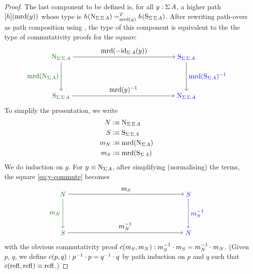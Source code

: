 \documentclass[english,a4paper]{lmcs}
\begin{document}
\begin{proof}
  The last component to be defined is, for all $y : \operatorname{\Sigma} A$,
  a higher path $\mathop{\left[{h}\right]}(\operatorname{\mathrm{mrd}}(y))$ whose type is
  $h(\mathrm{N}_{\operatorname{\Sigma}\operatorname{\Sigma} A}) =^{T}_{\operatorname{\mathrm{mrd}}(y)} h(\mathrm{S}_{\operatorname{\Sigma}\operatorname{\Sigma} A})$.
	After rewriting path-overs as path composition using \cite[Lem~2.11.3]{HoTT},
  the type of this component is equivalent to the the type of commutativity proofs for the square:
	\begin{equation}\label{eq:y-commute}
	\begin{tikzpicture}[x=6.5cm,y=-2cm,baseline=(current bounding box.center)]
	\node[text=darkgreen] (N1) at (0,0) {$\north_{\susp\susp A}$};
	\node[text=darkgreen] (S1) at (0,1) {$\south_{\susp\susp A}$};
	\node[text=darkblue] (S2) at (1,0) {$\south_{\susp\susp A}$};
	\node[text=darkblue] (N2) at (1,1) {$\north_{\susp\susp A}$};
	\draw[->,text=darkgreen] (N1) to node[left] {$\mrd(\north_{\susp A})$} (S1);
        \draw[->,text=darkblue] (S2) to node[right] {$\inv{\mrd(\south_{\susp A})}$} (N2);
	\draw[->] (N1) to node[above] {$\mrd(-\id_{\susp A}(y))$} (S2);
        \draw[->] (S1) to node[above] {$\inv{\mrd(y)}$} (N2);
	\end{tikzpicture}
	\end{equation}
	To simplify the presentation, we write
	\begin{align}
	N & \vcentcolon\equiv \mathrm{N}_{\operatorname{\Sigma} \operatorname{\Sigma} A} \\
	S & \vcentcolon\equiv \mathrm{S}_{\operatorname{\Sigma} \operatorname{\Sigma} A} \\
	m_N & \vcentcolon\equiv \operatorname{\mathrm{mrd}}(\mathrm{N}_{\operatorname{\Sigma} A}) \\
	m_S & \vcentcolon\equiv \operatorname{\mathrm{mrd}}(\mathrm{S}_{\operatorname{\Sigma} A})
	\end{align}
	We do induction on $y$.
	For $y \equiv \mathrm{N}_{\operatorname{\Sigma} A}$, after simplifying (normalising) the terms, the square \eqref{eq:y-commute} becomes
	\begin{equation}\label{eq:N-commute}
	\begin{tikzpicture}[x=6.5cm,y=-2cm,baseline=(current bounding box.center)]
	\node[text=darkgreen] (N1) at (0,0) {$N$};
	\node[text=darkgreen] (S1) at (0,1) {$S$};
	\node[text=darkblue] (S2) at (1,0) {$S$};
	\node[text=darkblue] (N2) at (1,1) {$N$};
	\draw[->,text=darkgreen,color=darkgreen] (N1) to node[left] {$m_N$} (S1);
        \draw[->,text=darkblue,color=darkblue] (S2) to node[right] {$\inv{m_S}$} (N2);
	\draw[->] (N1) to node[above] {$m_S$} (S2);
        \draw[->] (S1) to node[above] {$\inv{m_N}$} (N2);
	\end{tikzpicture}
	\end{equation}
        with the obvious commutativity proof $c(m_S,m_N) : m_S^{-1} \cdot {m_S} = m_N^{-1} \cdot {m_N}$. (Given $p$, $q$, we define $c(p,q) : p^{-1}\cdot p = q^{-1}\cdot q$ by path induction on $p$ and $q$ such that $c(\mathop{{\mathrm{refl}}_{}},\mathop{{\mathrm{refl}}_{}}) \equiv \mathop{{\mathrm{refl}}_{}}$.)

\end{proof}
\end{document}
